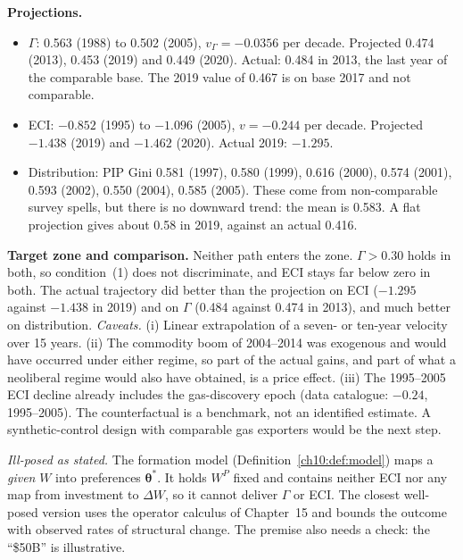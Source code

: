 \documentclass[../solutions_manual.tex]{subfiles}
\begin{document}
 \textbf{Projections.}
\begin{itemize}
\item $\Gamma$: 0.563 (1988) to 0.502 (2005), $v_\Gamma = -0.0356$ per decade. Projected 0.474 (2013), 0.453 (2019) and 0.449 (2020). Actual: 0.484 in 2013, the last year of the comparable base. The 2019 value of 0.467 is on base 2017 and not comparable.
\item ECI: $-0.852$ (1995) to $-1.096$ (2005), $v = -0.244$ per decade. Projected $-1.438$ (2019) and $-1.462$ (2020). Actual 2019: $-1.295$.
\item Distribution: PIP Gini 0.581 (1997), 0.580 (1999), 0.616 (2000), 0.574 (2001), 0.593 (2002), 0.550 (2004), 0.585 (2005). These come from non-comparable survey spells, but there is no downward trend: the mean is 0.583. A flat projection gives about 0.58 in 2019, against an actual 0.416.
\end{itemize}

 \textbf{Target zone and comparison.} Neither path enters the zone. $\Gamma > 0.30$ holds in both, so condition~(1) does not discriminate, and ECI stays far below zero in both. The actual trajectory did better than the projection on ECI ($-1.295$ against $-1.438$ in 2019) and on $\Gamma$ (0.484 against 0.474 in 2013), and much better on distribution. \emph{Caveats.} (i) Linear extrapolation of a seven- or ten-year velocity over 15 years. (ii) The commodity boom of 2004--2014 was exogenous and would have occurred under either regime, so part of the actual gains, and part of what a neoliberal regime would also have obtained, is a price effect. (iii) The 1995--2005 ECI decline already includes the gas-discovery epoch (data catalogue: $-0.24$, 1995--2005). The counterfactual is a benchmark, not an identified estimate. A synthetic-control design with comparable gas exporters would be the next step.


\emph{Ill-posed as stated.} The formation model (Definition~\ref{ch10:def:model}) maps a \emph{given} $W$ into preferences $\boldsymbol{\theta}^*$. It holds $W^P$ fixed and contains neither ECI nor any map from investment to $\Delta W$, so it cannot deliver $\Gamma$ or ECI. The closest well-posed version uses the operator calculus of Chapter~15 and bounds the outcome with observed rates of structural change. The premise also needs a check: the ``\$50B'' is illustrative.
\end{document}
